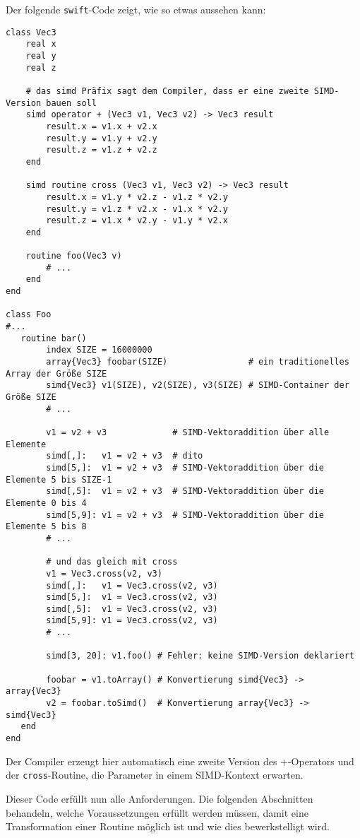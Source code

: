 \documentclass[a4paper,10pt]{article}
\begin{document}
Der folgende \texttt{swift}-Code zeigt, wie so etwas aussehen kann:


\begin{verbatim}
class Vec3
    real x
    real y
    real z

    # das simd Präfix sagt dem Compiler, dass er eine zweite SIMD-Version bauen soll
    simd operator + (Vec3 v1, Vec3 v2) -> Vec3 result
        result.x = v1.x + v2.x
        result.y = v1.y + v2.y
        result.z = v1.z + v2.z
    end

    simd routine cross (Vec3 v1, Vec3 v2) -> Vec3 result
        result.x = v1.y * v2.z - v1.z * v2.y
        result.y = v1.z * v2.x - v1.x * v2.y
        result.z = v1.x * v2.y - v1.y * v2.x
    end

    routine foo(Vec3 v)
        # ...
    end
end

class Foo
#...
   routine bar()
        index SIZE = 16000000
        array{Vec3} foobar(SIZE)                # ein traditionelles Array der Größe SIZE
        simd{Vec3} v1(SIZE), v2(SIZE), v3(SIZE) # SIMD-Container der Größe SIZE
        # ...

        v1 = v2 + v3             # SIMD-Vektoraddition über alle Elemente
        simd[,]:   v1 = v2 + v3  # dito
        simd[5,]:  v1 = v2 + v3  # SIMD-Vektoraddition über die Elemente 5 bis SIZE-1
        simd[,5]:  v1 = v2 + v3  # SIMD-Vektoraddition über die Elemente 0 bis 4
        simd[5,9]: v1 = v2 + v3  # SIMD-Vektoraddition über die Elemente 5 bis 8
        # ...

        # und das gleich mit cross
        v1 = Vec3.cross(v2, v3)
        simd[,]:   v1 = Vec3.cross(v2, v3)
        simd[5,]:  v1 = Vec3.cross(v2, v3)
        simd[,5]:  v1 = Vec3.cross(v2, v3)
        simd[5,9]: v1 = Vec3.cross(v2, v3)
        # ...

        simd[3, 20]: v1.foo() # Fehler: keine SIMD-Version deklariert

        foobar = v1.toArray() # Konvertierung simd{Vec3} -> array{Vec3}
        v2 = foobar.toSimd()  # Konvertierung array{Vec3} -> simd{Vec3}
   end
end
\end{verbatim}

Der Compiler erzeugt hier automatisch eine zweite Version des +-Operators und der
\texttt{cross}-Routine, die Parameter in einem SIMD-Kontext erwarten.

Dieser Code erfüllt nun alle Anforderungen. Die folgenden Abschnitten behandeln, welche
Voraussetzungen erfüllt werden müssen, damit eine Transformation einer Routine möglich ist und wie
dies bewerkstelligt wird.
\end{document}
